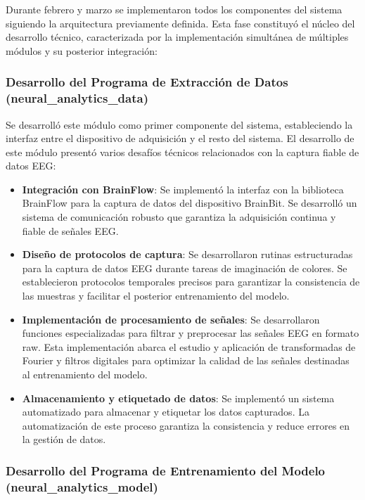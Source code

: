 Durante febrero y marzo se implementaron todos los componentes del sistema siguiendo la arquitectura previamente definida. Esta fase constituyó el núcleo del desarrollo técnico, caracterizada por la implementación simultánea de múltiples módulos y su posterior integración:

\subsubsection{Desarrollo del Programa de Extracción de Datos (neural\_analytics\_data)}

Se desarrolló este módulo como primer componente del sistema, estableciendo la interfaz entre el dispositivo de adquisición y el resto del sistema. El desarrollo de este módulo presentó varios desafíos técnicos relacionados con la captura fiable de datos EEG:

\begin{itemize}
    \item \textbf{Integración con BrainFlow}: Se implementó la interfaz con la biblioteca BrainFlow para la captura de datos del dispositivo BrainBit. Se desarrolló un sistema de comunicación robusto que garantiza la adquisición continua y fiable de señales EEG.
    
    \item \textbf{Diseño de protocolos de captura}: Se desarrollaron rutinas estructuradas para la captura de datos EEG durante tareas de imaginación de colores. Se establecieron protocolos temporales precisos para garantizar la consistencia de las muestras y facilitar el posterior entrenamiento del modelo.
    
    \item \textbf{Implementación de procesamiento de señales}: Se desarrollaron funciones especializadas para filtrar y preprocesar las señales EEG en formato raw. Esta implementación abarca el estudio y aplicación de transformadas de Fourier y filtros digitales para optimizar la calidad de las señales destinadas al entrenamiento del modelo.
    
    \item \textbf{Almacenamiento y etiquetado de datos}: Se implementó un sistema automatizado para almacenar y etiquetar los datos capturados. La automatización de este proceso garantiza la consistencia y reduce errores en la gestión de datos.
\end{itemize}

\newpage
\subsubsection{Desarrollo del Programa de Entrenamiento del Modelo (neural\_analytics\_model)}

